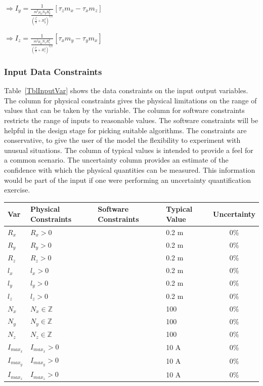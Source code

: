 \documentclass[12pt]{article}
\begin{document}
$\Rightarrow I_y=\frac{1}{\frac{m^2\mu _0N_yR_{y}^{2}}{\left( \frac{l_{y}^{2}}{4}+R_{y}^{2} \right) ^{3/2}}}\left[ \tau _zm_x-\tau _xm_z \right] $

$\Rightarrow I_z=\frac{1}{\frac{m^2\mu _0N_zR_{z}^{2}}{\left( \frac{l_{z}^{2}}{4}+R_{z}^{2} \right) ^{3/2}}}\left[ \tau _xm_y-\tau _ym_x \right] $


\subsubsection{Input Data Constraints} \label{sec_DataConstraints}    

Table~\ref{TblInputVar} shows the data constraints on the input output
variables.  The column for physical constraints gives the physical limitations
on the range of values that can be taken by the variable.  The column for
software constraints restricts the range of inputs to reasonable values.  The
software constraints will be helpful in the design stage for picking suitable
algorithms.  The constraints are conservative, to give the user of the model the
flexibility to experiment with unusual situations.  The column of typical values
is intended to provide a feel for a common scenario.  The uncertainty column
provides an estimate of the confidence with which the physical quantities can be
measured.  This information would be part of the input if one were performing an
uncertainty quantification exercise.


\begin{table}[H]
  \caption{Input Variables} \label{TblInputVar}
  \renewcommand{\arraystretch}{1.2}
\noindent \begin{longtable*}{l l l l c} 
  \toprule
  \textbf{Var} & \textbf{Physical Constraints} & \textbf{Software Constraints} &
                             \textbf{Typical Value} & \textbf{Uncertainty}\\
  \midrule 

  $R_x$ & $R_x > 0$ &   & 0.2 \si{\metre} & 0\% \\
  $R_y$ & $R_y > 0$ &   & 0.2 \si{\metre} & 0\% \\
  $R_z$ & $R_z > 0$ &   & 0.2 \si{\metre} & 0\% \\
  $l_x$ & $l_x > 0$ &   & 0.2 \si{\metre} & 0\% \\
  $l_y$ & $l_y > 0$ &   & 0.2 \si{\metre} & 0\% \\
  $l_z$ & $l_z > 0$ &   & 0.2 \si{\metre} & 0\% \\
  $N_x$ & $N_x \in \mathbb{Z}$ & & 100 & 0\% \\
  $N_y$ & $N_y \in \mathbb{Z}$ & & 100 & 0\% \\
  $N_z$ & $N_z \in \mathbb{Z}$ & & 100 & 0\% \\
  $I_{{max}_x}$ & $I_{{max}_x} > 0$ & $ $  & 10 \si{\ampere} & 0\% \\
  $I_{{max}_y}$ & $I_{{max}_y} > 0$ &  $ $ & 10 \si{\ampere} & 0\% \\
  $I_{{max}_z}$ & $I_{{max}_z} > 0$ &$ $ & 10 \si{\ampere} & 0\% \\

  \bottomrule
\end{longtable*}
\end{table}
\end{document}
